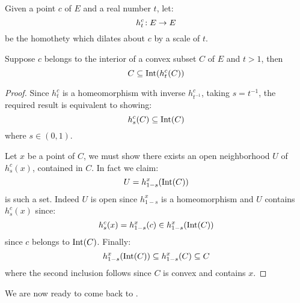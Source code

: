 \begin{lemma}
  \label{lem:int_homothety_cvx}
  \leanok
  Given a point $c$ of $E$ and a real number $t$, let:
  \[
    h^c_t \!: E \to E
  \]
  be the homothety which dilates about $c$ by a scale of $t$.

  Suppose $c$ belongs to the interior of a convex subset $C$ of $E$
  and $t > 1$, then
  \[
    C \subseteq \operatorname{Int}(h^c_t(C))
  \]
\end{lemma}

\begin{proof}
  \leanok
  Since $h^c_t$ is a homeomorphism with inverse $h^c_{t^{-1}}$, taking $s = t^{-1}$,
  the required result is equivalent to showing:
  \[
    h^c_s(C) \subseteq \operatorname{Int}(C)
  \]
  where $s \in (0, 1)$.

  Let $x$ be a point of $C$, we must show there exists an open neighborhood $U$
  of $h^c_s(x)$, contained in $C$. In fact we claim:
  \[
    U = h^x_{1-s}(\operatorname{Int}(C))
  \]
  is such a set. Indeed $U$ is open since $h^x_{1-s}$ is a homeomorphism and $U$
  contains $h^c_s(x)$ since:
  \[
    h^c_s(x) = h^x_{1-s}(c) \in h^x_{1-s}(\operatorname{Int}(C))
  \]
  since $c$ belongs to $\operatorname{Int}(C)$. Finally:
  \[
    h^x_{1-s}(\operatorname{Int}(C)) \subseteq h^x_{1-s}(C) \subseteq C
  \]
  where the second inclusion follows since $C$ is convex and contains $x$.
\end{proof}

We are now ready to come back to .

